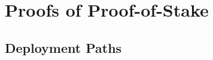 \chapter{Proofs of Proof-of-Stake}\label{chapter:stake}



\cite{pos-sidechains}

\section{Deployment Paths}
